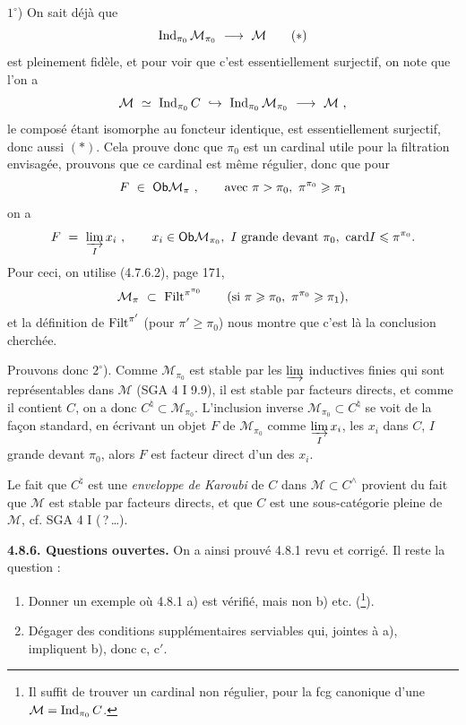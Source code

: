 $1^\circ$) On sait déjà que
\[
\Ind_{\pi_0}\mathcal{M}_{\pi_0} \ \longrightarrow \ \mathcal{M} \tag*{$(*)$}
\]
est pleinement fidèle, et pour voir que c'est essentiellement surjectif, on note que l'on a
\[
\mathcal{M} \ \simeq \ \Ind_{\pi_0}C \ \hookrightarrow \ \Ind_{\pi_0}\mathcal{M}_{\pi_0} \ \longrightarrow \ \mathcal{M} \ ,
\]
le composé étant isomorphe au foncteur identique, est essentiellement surjectif, donc aussi $(*)$. Cela prouve donc que $\pi_0$ est un cardinal utile pour la filtration envisagée, prouvons que ce cardinal est même régulier, donc que pour
\[
F \ \in \ \Ob\mathcal{M}_\pi \ , \qquad \text{avec } \pi>\pi_0,\ \pi^{\pi_0}\geqslant\pi_1
\]
on a
\[
F \ = \ \varinjlim_I x_i \ , \qquad x_i\in\Ob\mathcal{M}_{\pi_0},\ I \text{ grande devant } \pi_0,\ \card I\leqslant\pi^{\pi_0}.
\]
Pour ceci, on utilise (4.7.6.2), page 171,
\[
\mathcal{M}_\pi \ \subset \ \Filt^{\pi^{\pi_0}} \qquad (\text{si } \pi\geqslant\pi_0,\ \pi^{\pi_0}\geqslant\pi_1),
\]
et la définition de $\mathrm{Filt}^{\pi'}$ (pour $\pi'\geqslant\pi_0$) nous montre que c'est là la conclusion cherchée.

Prouvons donc $2^\circ$). Comme $\mathcal{M}_{\pi_0}$ est stable par les $\varinjlim$ inductives finies qui sont représentables dans $\mathcal{M}$ (SGA 4 I 9.9), il est stable par facteurs directs, et comme il contient $C$, on a donc $C^\natural\subset\mathcal{M}_{\pi_0}$. L'inclusion inverse $\mathcal{M}_{\pi_0}\subset C^\natural$ se voit de la façon standard, en écrivant un objet $F$ de $\mathcal{M}_{\pi_0}$ comme $\varinjlim\limits_I x_i$, les $x_i$ dans $C$, $I$ grande devant $\pi_0$, alors $F$ est facteur direct d'un des $x_i$.

Le fait que $C^\natural$ est une \textit{enveloppe de Karoubi} de $C$ dans $\mathcal{M}\subset C^\wedge$ provient du fait que $\mathcal{M}$ est stable par facteurs directs, et que $C$ est une sous-catégorie pleine de $\mathcal{M}$, cf. SGA 4 I (\,?\,\dots).

\textbf{4.8.6. Questions ouvertes.} On a ainsi prouvé 4.8.1 revu et corrigé. Il reste la question :
\begin{enumerate}
\item[1)] Donner un exemple où 4.8.1 a) est vérifié, mais non b) etc. (\footnote{Il suffit de trouver un cardinal non régulier, pour la fcg canonique d'une $\mathcal{M}=\operatorname{Ind}_{\pi_0}C$.}).
\item[2)] Dégager des conditions supplémentaires serviables qui, jointes à a), impliquent b), donc c, c$'$.
\end{enumerate}

